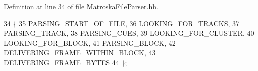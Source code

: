 Definition at line 34 of file Matroska\+File\+Parser.\+hh.


\begin{DoxyCode}
34                         \{
35   PARSING_START_OF_FILE,
36   LOOKING_FOR_TRACKS,
37   PARSING_TRACK,
38   PARSING_CUES,
39   LOOKING_FOR_CLUSTER,
40   LOOKING_FOR_BLOCK,
41   PARSING_BLOCK,
42   DELIVERING_FRAME_WITHIN_BLOCK,
43   DELIVERING_FRAME_BYTES
44 \};
\end{DoxyCode}
